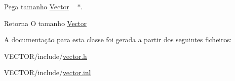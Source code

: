 Pega tamanho \hyperlink{class_vector}{Vector}   $\ast$. 

\begin{DoxyReturn}{Retorna}
O tamanho \hyperlink{class_vector}{Vector}   
\end{DoxyReturn}


A documentação para esta classe foi gerada a partir dos seguintes ficheiros\+:\begin{DoxyCompactItemize}
\item 
V\+E\+C\+T\+O\+R/include/\hyperlink{vector_8h}{vector.\+h}\item 
V\+E\+C\+T\+O\+R/include/\hyperlink{vector_8inl}{vector.\+inl}\end{DoxyCompactItemize}
